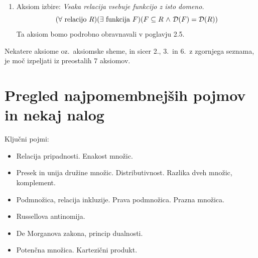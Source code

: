 \documentclass[11pt,paper=b5,DIV=13,headinclude,footinclude]{scrbook}
\def\inn {{~\wedge~}}
\def\sledi {{~\Rightarrow~}}
\def\cee {{~\Leftrightarrow~}}
\begin{document}
\begin{enumerate}
\item Aksiom izbire: \emph{ Vsaka relacija vsebuje funkcijo z isto domeno.}
$$(\forall \textrm{ relacijo }R)(\exists \textrm{ funkcija }F)(F\subseteq R \inn {\cal D}(F) = {\cal D}(R))$$
Ta aksiom bomo podrobno obravnavali v poglavju 2.5.






\end{enumerate}

Nekatere aksiome oz.~aksiomske sheme, in sicer 2., 3.~in 6.~z zgornjega seznama, je moč izpeljati iz preostalih 7 aksiomov.

\section{Pregled najpomembnejših pojmov in nekaj nalog}

Ključni pojmi:
\begin{itemize}
  \item Relacija pripadnosti. Enakost množic.
  \item Presek in unija družine množic. Distributivnost. Razlika dveh množic, komplement.
  \item Podmnožica, relacija inkluzije. Prava podmnožica. Prazna množica.
  \item Russellova antinomija.
  \item De Morganova zakona, princip dualnosti.
  \item Potenčna množica. Kartezični produkt.
\end{itemize}
\end{document}
